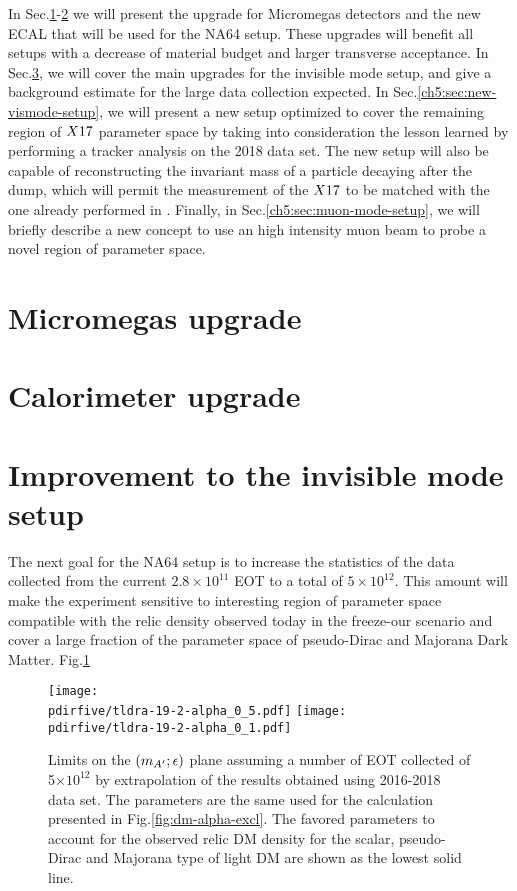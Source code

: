 In Sec.\ref{ch5:sec:mm-upgrades}-\ref{ch5:sec:cal-upgrades} we will present the upgrade for Micromegas detectors and the new ECAL that will be used for the NA64 setup. These upgrades will benefit all setups with a decrease of material budget and larger transverse acceptance. In Sec.\ref{ch5:sec:new-invismode-setup}, we will cover the main upgrades for the invisible mode setup, and give a background estimate for the large data collection expected. In Sec.\ref{ch5:sec:new-vismode-setup}, we will present a new setup optimized to cover the remaining region of $X17$ parameter space by taking into consideration the lesson learned by performing a tracker analysis on the 2018 data set. The new setup will also be capable of reconstructing the invariant mass of a particle decaying after the dump, which will permit the measurement of the $X17$ to be matched with the one already performed in \cite{Krasznahorkay:2015iga,Krasznahorkay:2019lyl}. Finally, in Sec.\ref{ch5:sec:muon-mode-setup}, we will briefly describe a new concept to use an high intensity muon beam to probe a novel region of parameter space.

\section{Micromegas upgrade}
\label{ch5:sec:mm-upgrades}

\section{Calorimeter upgrade}
\label{ch5:sec:cal-upgrades}

\section{Improvement to the invisible mode setup}
\label{ch5:sec:new-invismode-setup}

The next goal for the NA64 setup is to increase the statistics of the data collected from the current $2.8 \times 10^{11}$ EOT to a total of $5 \times 10^{12}$. This amount will make the experiment sensitive to interesting region of parameter space compatible with the relic density observed today in the freeze-our scenario and cover a large  fraction of the parameter space of pseudo-Dirac and Majorana Dark Matter. Fig.\ref{fig:dm-sens-proj}

\begin{figure}[bht!]
  \centering
  \texttt{[image: \\pdirfive/tldra-19-2-alpha\_0\_5.pdf]}
  \texttt{[image: \\pdirfive/tldra-19-2-alpha\_0\_1.pdf]}
  \caption[sensitivity projection for invisible mode 2021]{Limits on the $(m_{A'};\epsilon)$ plane assuming a number of EOT collected of 5$\times 10^{12}$ by extrapolation of the results obtained using 2016-2018 data set. The parameters are the same used for the calculation presented in Fig.\ref{fig:dm-alpha-excl}. The favored parameters to account for the observed relic DM density for the scalar, pseudo-Dirac and Majorana type of light DM are shown as the lowest solid line.}
  \label{fig:dm-sens-proj}
\end{figure}

